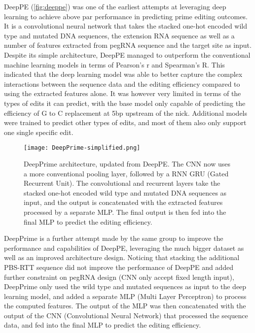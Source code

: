 DeepPE (\autoref{fig:deeppe}) was one of the earliest attempts at leveraging deep learning to achieve above par performance in predicting prime editing outcomes\cite{kimPredictingEfficiencyPrime2021}. It is a convolutional neural network that takes the stacked one-hot encoded wild type and  mutated DNA sequences, the extension RNA sequence as well as a number of features extracted from pegRNA sequence and the target site as input. Despite its simple architecture, DeepPE managed to outperform the conventional machine learning models in terms of Pearson's r and Spearman's R. This indicated that the deep learning model was able to better capture the complex interactions between the sequence data and the editing efficiency compared to using the extracted features alone. It was however very limited in terms of the types of edits it can predict, with the base model only capable of predicting the efficiency of G to C replacement at 5bp upstream of the nick. Additional models were trained to predict other types of edits, and most of them also only support one single specific edit.

\begin{figure}
    \centering
    \texttt{[image: DeepPrime-simplified.png]}
    \caption[DeepPrime architecture]{DeepPrime architecture, updated from DeepPE. The CNN now uses a more conventional pooling layer, followed by a RNN GRU (Gated Recurrent Unit). The convolutional and recurrent layers take the stacked one-hot encoded wild type and mutated DNA sequences as input, and the output is concatenated with the extracted features processed by a separate MLP. The final output is then fed into the final MLP to predict the editing efficiency.}
    \label{fig:deepprime}
\end{figure}

DeepPrime is a further attempt made by the same group to improve the performance and capabilities of DeepPE, leveraging the much bigger dataset as well as an improved architecture design\cite{yuPredictionEfficienciesDiverse2023}.
Noticing that stacking the additional PBS-RTT sequence did not improve the performance of DeepPE and added further constraint on pegRNA design (CNN only accept fixed length input), DeepPrime only used the wild type and mutated sequences as input to the deep learning model, and added a separate MLP (Multi Layer Perceptron) to process the computed features. The output of the MLP was then concatenated with the output of the CNN (Convolutional Neural Network) that processed the sequence data, and fed into the final MLP to predict the editing efficiency. 

